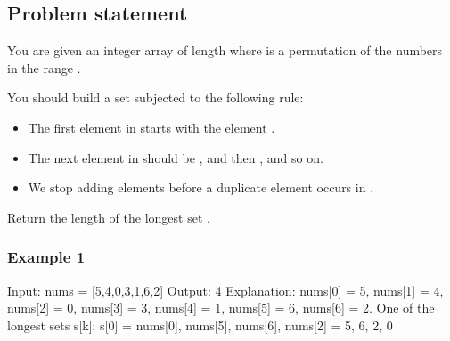 \documentclass[letterpaper,12pt,english]{book}
\begin{document}
\subsection{Problem statement\sphinxfootnotemark[133]}
\label{\detokenize{Mathematics/09_MTH_565_Array_Nesting:problem-statement}}%
\begin{footnotetext}[133]\sphinxAtStartFootnote
{}
%
\end{footnotetext}\ignorespaces 
\sphinxAtStartPar
You are given an integer array  of length  where  is a permutation of the numbers in the range \sphinxcode{\sphinxupquote{{[}0, n \sphinxhyphen{} 1{]}}}.

\sphinxAtStartPar
You should build a set  subjected to the following rule:
\begin{itemize}
\item {} 
\sphinxAtStartPar
The first element in  starts with the element .

\item {} 
\sphinxAtStartPar
The next element in  should be , and then , and so on.

\item {} 
\sphinxAtStartPar
We stop adding elements before a duplicate element occurs in .

\end{itemize}

\sphinxAtStartPar
Return the length of the longest set .


\subsubsection{Example 1}
\label{\detokenize{Mathematics/09_MTH_565_Array_Nesting:example-1}}
\begin{sphinxVerbatim}[commandchars=\\\{\}]
Input: nums = [5,4,0,3,1,6,2]
Output: 4
Explanation: 
nums[0] = 5, nums[1] = 4, nums[2] = 0, nums[3] = 3, nums[4] = 1, nums[5] = 6, nums[6] = 2.
One of the longest sets s[k]:
s[0] = \PYGZob{}nums[0], nums[5], nums[6], nums[2]\PYGZcb{} = \PYGZob{}5, 6, 2, 0\PYGZcb{}
\end{sphinxVerbatim}
\end{document}
